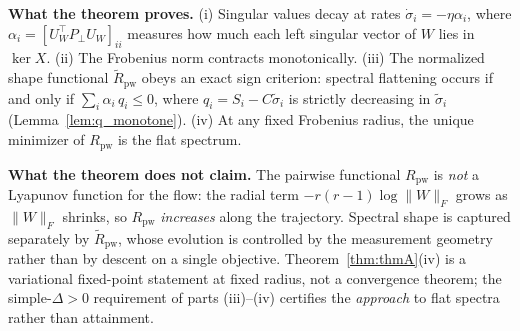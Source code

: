 \documentclass{article}
\begin{document}
\textbf{What the theorem proves.} (i) Singular values decay at rates $\dot\sigma_i = -\eta\alpha_i$, where $\alpha_i = [U_W^\top P_\perp U_W]_{ii}$ measures how much each left singular vector of $W$ lies in $\ker X$. (ii) The Frobenius norm contracts monotonically. (iii) The normalized shape functional $\widetilde R_{\mathrm{pw}}$ obeys an exact sign criterion: spectral flattening occurs if and only if $\sum_i\alpha_i\,q_i \leq 0$, where $q_i = S_i - C\widetilde\sigma_i$ is strictly decreasing in $\widetilde\sigma_i$ (Lemma~\ref{lem:q_monotone}). (iv) At any fixed Frobenius radius, the unique minimizer of $R_{\mathrm{pw}}$ is the flat spectrum.

\textbf{What the theorem does not claim.} The pairwise functional $R_{\mathrm{pw}}$ is \emph{not} a Lyapunov function for the flow: the radial term $-r(r-1)\log\|W\|_F$ grows as $\|W\|_F$ shrinks, so $R_{\mathrm{pw}}$ \emph{increases} along the trajectory. Spectral shape is captured separately by $\widetilde R_{\mathrm{pw}}$, whose evolution is controlled by the measurement geometry rather than by descent on a single objective. Theorem~\ref{thm:thmA}(iv) is a variational fixed-point statement at fixed radius, not a convergence theorem; the simple-$\Delta>0$ requirement of parts (iii)--(iv) certifies the \emph{approach} to flat spectra rather than attainment.
\end{document}
